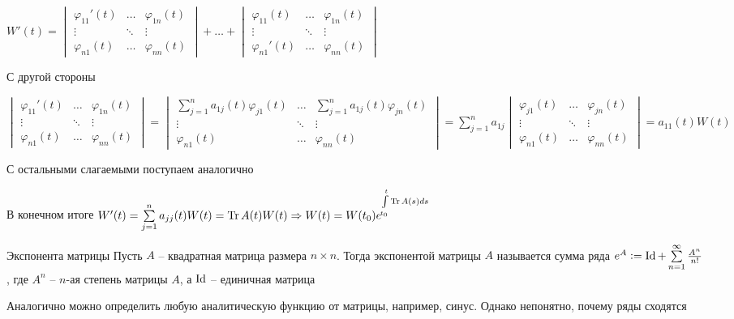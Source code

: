 \documentclass[12pt]{article}
\begin{document}
$W'(t) = \begin{vmatrix}
    \varphi_{11}'(t) & \ldots & \varphi_{1n}(t) \\
    \vdots & \ddots & \vdots \\
    \varphi_{n1}(t) & \ldots & \varphi_{nn}(t)
\end{vmatrix} + \ldots + \begin{vmatrix}
    \varphi_{11}(t) & \ldots & \varphi_{1n}(t) \\
    \vdots & \ddots & \vdots \\
    \varphi_{n1}'(t) & \ldots & \varphi_{nn}(t)
\end{vmatrix}$

С другой стороны

$\begin{vmatrix}
    \varphi_{11}'(t) & \ldots & \varphi_{1n}(t) \\
    \vdots & \ddots & \vdots \\
    \varphi_{n1}(t) & \ldots & \varphi_{nn}(t)
\end{vmatrix} = \begin{vmatrix}
    \sum\limits_{j = 1}^n a_{1j}(t)\varphi_{j1}(t) & \ldots & \sum\limits_{j = 1}^n a_{1j}(t)\varphi_{jn}(t) \\
    \vdots & \ddots & \vdots \\
    \varphi_{n1}(t) & \ldots & \varphi_{nn}(t)
\end{vmatrix} = \sum\limits_{j = 1}^n a_{1j} \begin{vmatrix}
        \varphi_{j1}(t) & \ldots & \varphi_{jn}(t) \\
        \vdots & \ddots & \vdots \\
        \varphi_{n1}(t) & \ldots & \varphi_{nn}(t)
\end{vmatrix} = a_{11}(t)W(t)$

С остальными слагаемыми поступаем аналогично

В конечном итоге $W'(t) = \sum\limits_{j = 1}^n a_{jj}(t)W(t) = \operatorname{Tr} A(t) W(t) \Rightarrow W(t) = W(t_0)e^{\int\limits_{t_0}^t \operatorname{Tr} A(s) ds}$

\begin{defin}{Экспонента матрицы}
    Пусть $A$ -- квадратная матрица размера $n \times n$. Тогда экспонентой матрицы $A$ называется сумма ряда $e^A := \operatorname{Id} + \sum\limits_{n = 1}^\infty \frac{A^n}{n!}$, где $A^n$ -- $n$-ая степень матрицы $A$, а $\operatorname{Id}$ -- единичная матрица
\end{defin}

\begin{Remark}{}
    Аналогично можно определить любую аналитическую функцию от матрицы, например, синус. Однако непонятно, почему ряды сходятся
\end{Remark}
\end{document}

